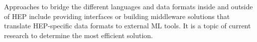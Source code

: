 
Approaches to bridge the different languages and data formats inside and outside of HEP include providing interfaces or building middleware solutions that translate HEP-specific data formats to external ML tools. It is a topic of current research to determine the most efficient solution.



